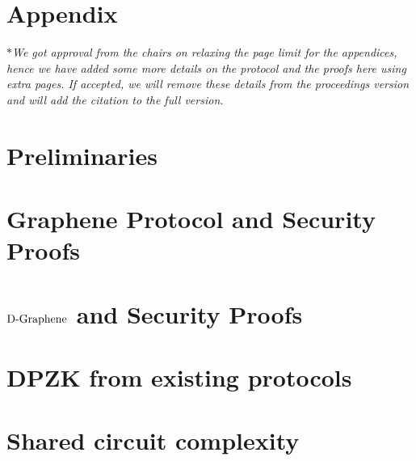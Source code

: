 \documentclass[USenglish,oneside,twocolumn]{article}
\begin{document}




%
\appendix
\section*{Appendix}
\textit{$\ast$We got approval from the chairs on relaxing the page limit for the appendices, hence we have added some more details on the protocol and the proofs here using extra pages. If accepted, we will remove these details from the proceedings version and will add the citation to the full version.}
%
\section{Preliminaries}
\label{app:securitydef}

\section{Graphene Protocol and Security Proofs}
\label{app:grapehene_securityproofs}

\section{$\text{D-Graphene}$ and Security Proofs}
\label{app:dp_grapehene_securityproofs}

\section{DPZK from existing protocols}
\label{app:dpzk_others}

\section*{ }
\label{app:DP_Protocols}

\section{Shared circuit complexity}
\label{app:shared_ciruit}

\end{document}
